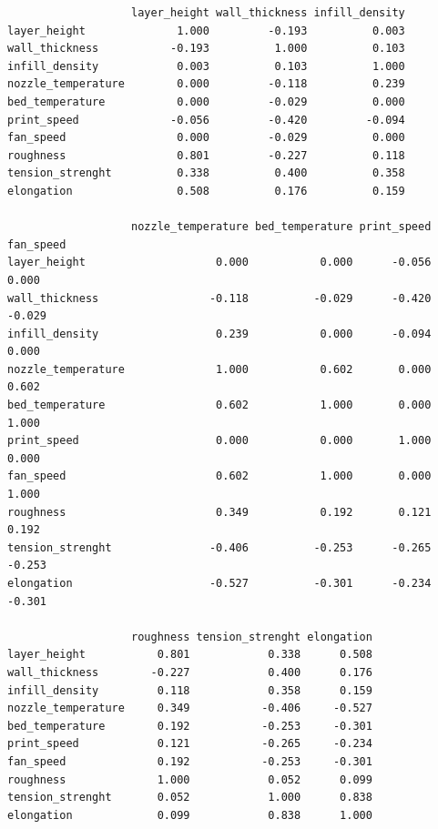 \begin{verbatim}
                   layer_height wall_thickness infill_density
layer_height              1.000         -0.193          0.003
wall_thickness           -0.193          1.000          0.103
infill_density            0.003          0.103          1.000
nozzle_temperature        0.000         -0.118          0.239
bed_temperature           0.000         -0.029          0.000
print_speed              -0.056         -0.420         -0.094
fan_speed                 0.000         -0.029          0.000
roughness                 0.801         -0.227          0.118
tension_strenght          0.338          0.400          0.358
elongation                0.508          0.176          0.159

                   nozzle_temperature bed_temperature print_speed fan_speed
layer_height                    0.000           0.000      -0.056     0.000
wall_thickness                 -0.118          -0.029      -0.420    -0.029
infill_density                  0.239           0.000      -0.094     0.000
nozzle_temperature              1.000           0.602       0.000     0.602
bed_temperature                 0.602           1.000       0.000     1.000
print_speed                     0.000           0.000       1.000     0.000
fan_speed                       0.602           1.000       0.000     1.000
roughness                       0.349           0.192       0.121     0.192
tension_strenght               -0.406          -0.253      -0.265    -0.253
elongation                     -0.527          -0.301      -0.234    -0.301

                   roughness tension_strenght elongation
layer_height           0.801            0.338      0.508
wall_thickness        -0.227            0.400      0.176
infill_density         0.118            0.358      0.159
nozzle_temperature     0.349           -0.406     -0.527
bed_temperature        0.192           -0.253     -0.301
print_speed            0.121           -0.265     -0.234
fan_speed              0.192           -0.253     -0.301
roughness              1.000            0.052      0.099
tension_strenght       0.052            1.000      0.838
elongation             0.099            0.838      1.000
\end{verbatim}

